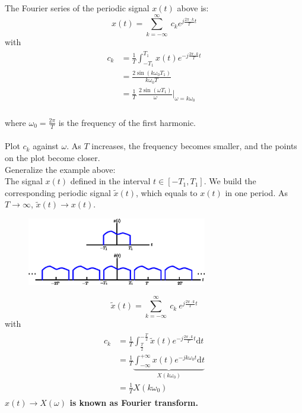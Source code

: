 \begin{ex}{}
    The Fourier series of the periodic signal $x(t)$ above is:
    \[ 
    x(t) =  \sum_{k=-\infty}^{\infty} \ c_{k} e^{j\frac{2\pi\cdot k}{T}t}
    \]
    with
    \begin{align*}
    \begin{split}
        c_{k} 
        &= \frac{1}{T} \int_{-T_{1}}^{T_{1}} x(t)e^{-j\frac{2\pi\cdot k}{T}t} \\
        &= \frac{2 \sin(k \omega_{0} T_{1})}{k \omega_{0} T} \\
        &=\frac{1}{T} \ \frac{2 \sin(\omega T_{1})}{\omega} \bigg\rvert_{\omega = k \omega_{0}} 
    \end{split} 
    \end{align*}\\
    where $\omega_{0}=\frac{2\pi}{T}$ is the frequency of the first harmonic.\\\\
    Plot $c_{k}$ against $\omega$. As $T$ increases, the frequency becomes smaller, and the points on the plot become closer.\\
    
    Generalize the example above:\\
    The signal $x(t)$ defined in the interval $t \in [-T_{1}, T_{1}]$. We build the corresponding periodic signal $\tilde{x}(t)$, which equals to $x(t)$ in one period. As $T \to \infty$, $\tilde{x}(t) \to x(t)$.
    \begin{figure}[H] 
        \centering 
        \includegraphics[width = 0.7\textwidth]{images/periodic_duplication.eps} 
    \end{figure}
    
    \[ 
        \tilde{x}(t) = \sum_{k=-\infty}^{\infty} \ c_{k} \ e^{j\frac{2\pi\cdot k}{T}t} 
    \]
    \quad with
    \begin{align*}
    \begin{split}
        c_{k} 
        &= \frac{1}{T} \int_{\frac{T}{2}}^{-\frac{T}{2}} \tilde{x}(t)e^{-j\frac{2\pi\cdot k}{T}t} \mathrm{d}t \\
        &= \frac{1}{T} \underbrace{\int_{-\infty}^{+\infty} x(t)e^{-j k \omega_{0} t} \mathrm{d}t}_{X(k\omega_{0})}\\
        &=\frac{1}{T} X(k\omega_{0}) 
    \end{split}
    \end{align*}
    \textbf{ $x(t) \to X(\omega)$ is known as Fourier transform.}
    

\end{ex}
